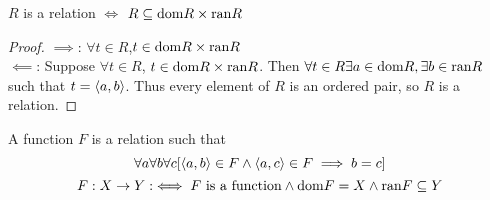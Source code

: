 \begin{prop}
$R$ is a relation $\iff$ $R \subseteq \text{dom} R \times \text{ran} R$
\end{prop}
\begin{proof}
$\implies$: $\forall t \in R$,$t \in \text{dom} R \times \text{ran} R$\\
$\impliedby$: Suppose $\forall t \in R$, $t \in \text{dom} R \times \text{ran} R$. Then $\forall t \in R \exists a \in \text{dom} R, \exists b \in \text{ran} R$ such that $t = \langle a, b\rangle$. Thus every element of $R$ is an ordered pair, so $R$ is a relation.
\end{proof}
\begin{defn}[Function]
A function $F$ is a relation such that \[\forall a \forall b \forall c [\langle a, b\rangle \in F \wedge \langle a, c\rangle \in F \implies b = c]\]
\[F: X \to Y : \iff F \text{ is a function} \wedge \text{dom} F = X \wedge \text{ran} F \subseteq Y\]
\end{defn}


